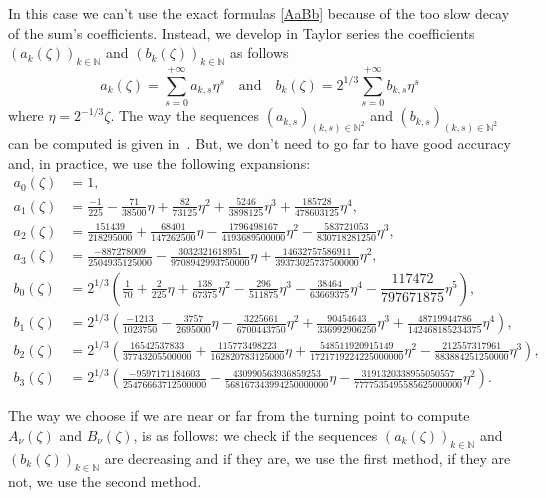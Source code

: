 \documentclass[12pt,a4paper]{article}
\numberwithin{equation}{section}
\newcommand{\bbN}{\mathbb{N}}
\newcommand{\plr}[1]{\left(#1\right)}
\theoremstyle{definition}
\theoremstyle{plain}
\theoremstyle{remark}
\begin{document}
In this case we can't use the exact formulas \cref{AaBb} because of the too slow decay of the sum's coefficients.
Instead, we develop in Taylor series the coefficients \( \plr{a_k(\zeta)}_{k \in \bbN} \) and \( \plr{b_k(\zeta)}_{k \in \bbN} \) as follows
\[
    a_k(\zeta) = \sum_{s = 0}^{+\infty} a_{k, s} \eta^s
    \quad \text{and} \quad
    b_k(\zeta) = 2^{1/3} \sum_{s = 0}^{+\infty} b_{k, s} \eta^s
\]
where \( \eta = 2^{-1/3} \zeta \).
The way the sequences \( \plr{a_{k, s}}_{(k,s) \in \bbN^2} \) and \( \plr{b_{k, s}}_{(k,s) \in \bbN^2} \) can be computed is given in~\cite{Tem97}.
But, we don't need to go far to have good accuracy and, in practice, we use the following expansions:
\begin{align*}
    a_0(\zeta) & = 1,
    \\
    a_1(\zeta) & = \frac{-1}{225}-\frac{71}{38500}\eta+\frac{82}{73125}\eta^2+\frac{5246}{3898125}\eta^3+\frac{185728}{478603125}\eta^4,
    \\
    a_2(\zeta) & = \frac{151439}{218295000}+\frac{68401}{147262500}\eta-\frac{1796498167}{4193689500000}\eta^2-\frac{583721053}{830718281250}\eta^3,
    \\
    a_3(\zeta) & = \frac{-887278009}{2504935125000}-\frac{3032321618951}{9708942993750000}\eta+\frac{14632757586911}{39373025737500000}\eta^2,
    \\
    b_0(\zeta) & = 2^{1/3} \left(\frac{1}{70}+\frac{2}{225}\eta+\frac{138}{67375}\eta^2-\frac{296}{511875}\eta^3-\frac{38464}{63669375}\eta^4-\dfrac{117472}{797671875}\eta^5 \right),
    \\
    b_1(\zeta) & = 2^{1/3} \left(\frac{-1213}{1023750}-\frac{3757}{2695000}\eta-\frac{3225661}{6700443750}\eta^2+\frac{90454643}{336992906250}\eta^3+\frac{48719944786}{142468185234375}\eta^4 \right),
    \\
    b_2(\zeta) & = 2^{1/3} \left(\frac{16542537833}{37743205500000}+\frac{115773498223}{162820783125000}\eta+\frac{548511920915149}{1721719224225000000}\eta^2-\frac{212557317961}{883884251250000}\eta^3 \right),
    \\
    b_3(\zeta) & = 2^{1/3} \left(\frac{-9597171184603}{25476663712500000}-\frac{430990563936859253}{568167343994250000000}\eta-\frac{3191320338955050557}{7777535495585625000000}\eta^2 \right).
\end{align*}

\bigskip

The way we choose if we are near or far from the turning point to compute \( A_\nu(\zeta) \) and \( B_\nu(\zeta) \), is as follows: we check if the sequences \( \plr{a_k(\zeta)}_{k \in \bbN} \) and \( \plr{b_k(\zeta)}_{k \in \bbN} \) are decreasing and if they are, we use the first method, if they are not, we use the second method.
\end{document}
